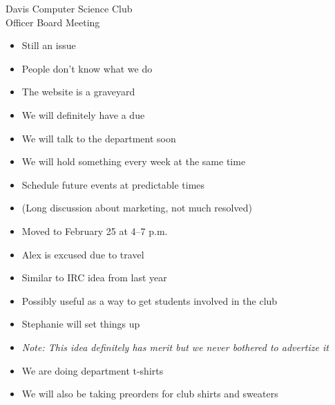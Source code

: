 \documentclass{article}
\begin{document}
\begin{Minutes}{Davis Computer Science Club\\Officer Board Meeting}
\missingExcused{}




\maketitle
{}
\begin{itemize}
\item Still an issue
\item People don't know what we do
\item The website is a graveyard
\end{itemize}

\begin{itemize}
\item We will definitely have a due
\item We will talk to the department soon
\end{itemize}

\begin{itemize}
\item We will hold something every week at the same time
\item Schedule future events at predictable times
\item (Long discussion about marketing, not much resolved)
\end{itemize}

\begin{itemize}
\item Moved to February 25 at 4--7 p.m.
\item Alex is excused due to travel
\end{itemize}

\begin{itemize}
\item Similar to IRC idea from last year
\item Possibly useful as a way to get students involved in the club
\item Stephanie will set things up
\item \textit{Note: This idea definitely has merit but we never bothered to
    advertize it}
\end{itemize}

\begin{itemize}
\item We are doing department t-shirts
\item We will also be taking preorders for club shirts and sweaters
\end{itemize}
\thispagestyle{creditfooter}
\end{Minutes}
\end{document}

